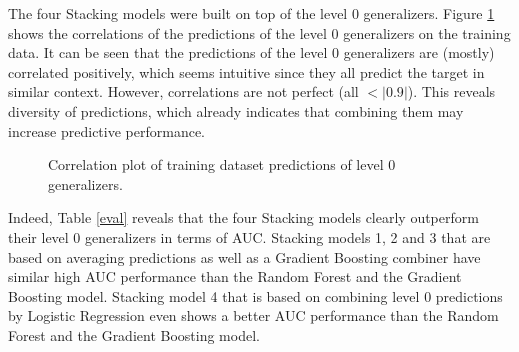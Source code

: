 \documentclass[12pt]{article}
\begin{document}
\noindent The four Stacking models were built on top of the level 0 generalizers. Figure \ref{corrgram} shows the correlations of the predictions of the level 0 generalizers on the training data. It can be seen that the predictions of the level 0 generalizers are (mostly) correlated positively, which seems intuitive since they all predict the target in similar context. However, correlations are not perfect (all $<|0.9|$). This reveals diversity of predictions, which already indicates that combining them may increase predictive performance.

\begin{figure}[htp] 
\caption[Correlation of Predictions]{Correlation plot of training dataset predictions of level 0 generalizers.}\label{corrgram}
\end{figure}  

Indeed, Table \ref{eval} reveals that the four Stacking models clearly outperform their level 0 generalizers in terms of AUC. Stacking models 1, 2 and 3 that are based on averaging predictions as well as a Gradient Boosting combiner have similar high AUC performance than the Random Forest and the Gradient Boosting model. Stacking model 4 that is based on combining level 0 predictions by Logistic Regression even shows a better AUC performance than the Random Forest and the Gradient Boosting model. 
\end{document}
